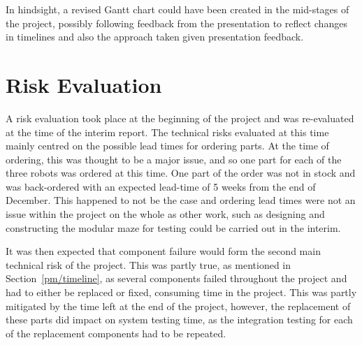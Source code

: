 In hindsight, a revised Gantt chart could have been created in the mid-stages of the project, possibly following feedback from the presentation to reflect changes in timelines and also the approach taken given presentation feedback. 

\section{Risk Evaluation}\label{pm/riskeval}
A risk evaluation took place at the beginning of the project and
was re-evaluated at the time of the interim report. The technical
risks evaluated at this time mainly centred on the possible lead
times for ordering parts. At the time of ordering, this was
thought to be a major issue, and so one part for each of the three
robots was ordered at this time. One part of the order
was not in stock and was back-ordered with an expected
lead-time of 5 weeks from the end of December. This happened to
not be the case and ordering lead times were not an issue within
the project on the whole as other work, such as designing and
constructing the modular maze for testing could be carried out in
the interim.

It was then expected that component failure would form the second
main technical risk of the project. This was partly true, as
mentioned in Section~\ref{pm/timeline}, as several components
failed throughout the project and had to either be replaced or
fixed, consuming time in the project. This was partly mitigated by
the time left at the end of the project, however, the replacement
of these parts did impact on system testing time, as the
integration testing for each of the replacement components had to
be repeated.
